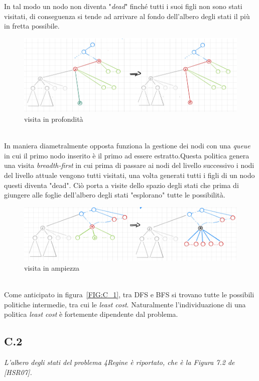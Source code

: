 \documentclass[a4paper]{article}
\begin{document}
In tal modo un nodo non diventa "\emph{dead}" finché tutti i suoi figli non sono stati visitati, di conseguenza si tende ad arrivare al fondo dell'albero degli stati il più in fretta possibile.
\begin{figure}[!ht]
\centering
\includegraphics[width=1\textwidth]{./img/C_1_DFS.png}
\caption{visita in profondità} \label{FIG:C_1_DFS}
\end{figure}\\
In maniera diametralmente opposta funziona la gestione dei nodi con una \emph{queue} in cui il primo nodo inserito è il primo ad essere estratto.Questa politica genera una visita \textit{breadth-first} in cui prima di passare ai nodi del livello successivo i nodi del livello attuale vengono tutti visitati, una volta generati tutti i figli di un nodo questi diventa "dead".
Ciò porta a visite dello spazio degli stati che prima di giungere alle foglie dell'albero degli stati "esplorano" tutte le possibilità.
\begin{figure}[!ht]
\centering
\includegraphics[width=1\textwidth]{./img/C_1_BFS.png}
\caption{visita in ampiezza} \label{FIG:C_1_BFS}
\end{figure}\\
Come anticipato in figura~\ref{FIG:C_1}, tra DFS e BFS si trovano tutte le possibili politiche intermedie, tra cui le \textit{least cost}. Naturalmente l'individuazione di una politica \textit{least cost} è fortemente dipendente dal problema.
\subsection{C.2}
\emph{L'albero degli stati del problema 4Regine è riportato, che è la Figura 7.2 de [HSR07].}\\
\end{document}
